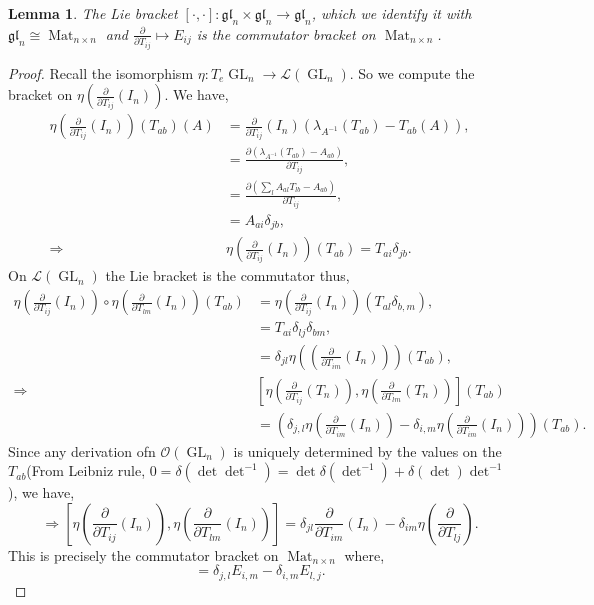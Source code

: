 \documentclass[10pt]{article}
\newtheorem{lemma}{Lemma}[section]
\numberwithin{equation}{theorem}
\DeclareMathOperator{\GL}{GL}
\DeclareMathOperator{\Mat}{Mat}
\newcommand{\Ouv}[0]{\mathcal{O}}
\newcommand{\Lie}[0]{\mathcal{L}}
\newcommand{\gl}[0]{\mathfrak{gl}}
\begin{document}
\begin{lemma}
  \label{lemma_5_15}
  The Lie bracket $[\cdot,\cdot]:\gl_n\times\gl_n\to\gl_n$, which we identify it with $\gl_n\cong \Mat_{n\times n}$ and ${\frac {\partial} {\partial T_{ij}}}\mapsto E_{ij}$ is the commutator bracket on $\Mat_{n\times n}$.
\end{lemma}
\begin{proof}
  Recall the isomorphism $\eta:T_e\GL_n\to\Lie(\GL_n)$. So we compute the bracket on $\eta\left({\frac {\partial }{\partial T_{ij}}}(I_n)\right)$. We have,
  \begin{align*}
    \eta\left({\frac {\partial }{\partial T_{ij}}}(I_n)\right)(T_{ab})(A) &= {\frac {\partial }{\partial T_{ij}}}(I_n)(\lambda_{A^{-1}}(T_{ab})-T_{ab}(A)),\\
    & = {\frac {\partial (\lambda_{A^{-1}}(T_{ab})-A_{ab})} {\partial T_{ij}}},\\
     & = {\frac {\partial (\sum_{l}A_{al}T_{lb}-A_{ab})} {\partial T_{ij}}},\\
     & = A_{ai}\delta_{jb},\\
     \Rightarrow & \eta\left({\frac {\partial }{\partial T_{ij}}}(I_n)\right)(T_{ab}) = T_{ai}\delta_{jb}.
  \end{align*}
  On $\Lie(\GL_n)$ the Lie bracket is the commutator thus,
  \begin{align*}
    \eta\left({\frac {\partial }{\partial T_{ij}}}(I_n)\right)\circ\eta\left({\frac {\partial }{\partial T_{lm}}}(I_n)\right)(T_{ab})& = \eta\left({\frac {\partial }{\partial T_{ij}}}(I_n)\right)(T_{al}\delta_{b,m}),\\
    & = T_{ai}\delta_{lj}\delta_{{bm}},\\
    & = \delta_{jl}\eta(\left({\frac {\partial} {\partial T_{im}}}(I_n)\right))(T_{ab}),\\
    \Rightarrow & \left[\eta\left({\frac {\partial }{\partial T_{ij}}}(T_n)\right),\eta\left({\frac {\partial }{\partial T_{lm}}}(T_n)\right)\right](T_{ab})\\
                & = \left(\delta_{j,l}\eta\left({\frac {\partial} {\partial T_{im}}}(I_n)\right)-\delta_{i,m}\eta\left({\frac {\partial} {\partial T_{im}}}(I_n)\right)\right)(T_{ab}).
  \end{align*}
  Since any derivation ofn $\Ouv(\GL_n)$ is uniquely determined by the values on the $T_{ab}$(From Leibniz rule, $0 = \delta(\det\det^{-1}) = \det\delta(\det^{-1})+\delta(\det)\det^{-1}$), we have,
  \begin{equation*}
    \Rightarrow \left[\eta\left({\frac {\partial} {\partial T_{ij}}}(I_n)\right),\eta\left({\frac {\partial} {\partial T_{lm}}}(I_n)\right)\right] = \delta_{jl}{\frac {\partial} {\partial T_{im}}}(I_n)-\delta_{im}\eta\left({\frac {\partial} {\partial T_{lj}}}\right).
  \end{equation*}
  This is precisely the commutator bracket on $\Mat_{n\times n}$ where,
  \begin{equation*}
    [E_{ij},E_{lm}] = \delta_{j,l}E_{i,m}-\delta_{i,m}E_{l,j}.
  \end{equation*}
\end{proof}
\end{document}
